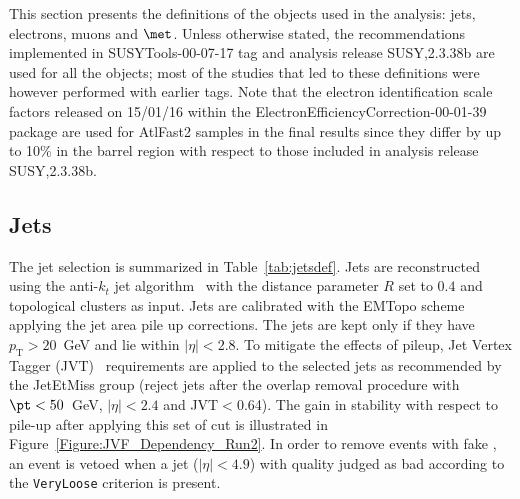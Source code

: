 This section presents the definitions of the objects used in the analysis: jets, electrons, muons and $\met$. 
Unless otherwise stated, the recommendations implemented in SUSYTools-00-07-17 tag and analysis release SUSY,2.3.38b 
are used for all the objects; most of the studies that led to these definitions were however performed with earlier tags. 
Note that the electron identification scale factors released on 15/01/16 within the ElectronEfficiencyCorrection-00-01-39 
package are used for AtlFast2 samples in the final results since they differ by up to 10\% in the barrel region with respect 
to those included in analysis release SUSY,2.3.38b.

\subsection{Jets}
\label{sec:objects_jets}

The jet selection is summarized in Table~\ref{tab:jetsdef}. 
Jets are reconstructed using the anti-$k_{t}$ jet algorithm~\cite{Cacciari:2008gp} 
with the distance parameter $R$ set to $0.4$ and topological clusters as input. 
Jets are calibrated with the EMTopo scheme applying the jet area pile up corrections. 
The jets are kept only if they have $p_\mathrm{T}>20$~GeV and lie within $|\eta|<2.8$. 
To mitigate the effects of pileup, Jet Vertex Tagger ({\sc JVT})~\cite{ATLAS-CONF-2014-018} requirements 
are applied to the selected jets as recommended by the JetEtMiss group (reject jets after the overlap removal procedure with $\pt<50$~GeV, $|\eta|<2.4$ and JVT$<$0.64). 
The gain in stability with respect to pile-up after
applying this set of cut is illustrated in Figure~\ref{Figure:JVF_Dependency_Run2}.
In order to remove events with fake \met, an event is vetoed 
when a jet ($|\eta|<4.9$) with quality judged as bad according to the {\tt VeryLoose} criterion is present. 

